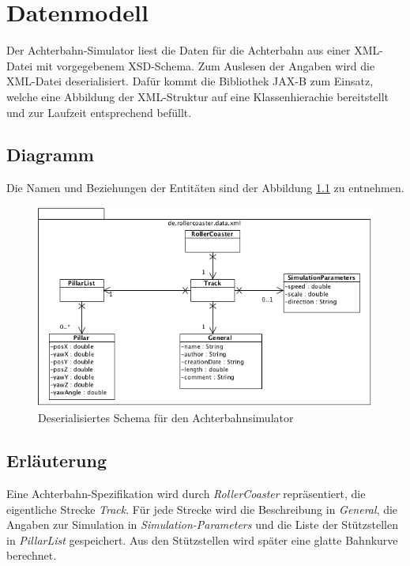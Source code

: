 \chapter{Datenmodell}
Der Achterbahn-Simulator liest die Daten für die Achterbahn aus einer XML-Datei
mit vorgegebenem XSD-Schema. Zum Auslesen der Angaben wird die XML-Datei deserialisiert.
Dafür kommt die Bibliothek JAX-B zum Einsatz, welche eine Abbildung der XML-Struktur
auf eine Klassenhierachie bereitstellt und zur Laufzeit entsprechend befüllt.

\section{Diagramm}
Die Namen und Beziehungen der Entitäten sind der Abbildung \ref{fig:xml} zu entnehmen.

\begin{figure}
\includegraphics[width=\linewidth]{bilder/XML.png}
\caption{Deserialisiertes Schema für den Achterbahnsimulator}
\label{fig:xml}
\end{figure}

\section{Erläuterung}
Eine Achterbahn-Spezifikation wird durch \emph{RollerCoaster}
repräsentiert, die eigentliche Strecke \emph{Track}. Für jede Strecke
wird die Beschreibung in \emph{General}, die Angaben zur Simulation
in \emph{Simulation-Parameters} und die Liste der Stützstellen 
in \emph{PillarList} gespeichert. Aus den Stützstellen wird später eine
glatte Bahnkurve berechnet.

